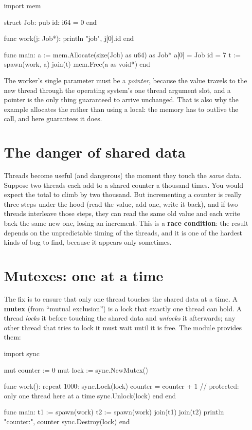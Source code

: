 \begin{salamen}
import mem

struct Job:
    pub id: i64 = 0
end

func work(j: Job*):
    println "job", j[0].id
end

func main:
    a := mem.Allocate(size(Job) as u64) as Job*
    a[0] = Job { id = 7 }
    t := spawn(work, a)
    join(t)
    mem.Free(a as void*)
end
\end{salamen}

The worker's single parameter must be a \emph{pointer}, because the value travels
to the new thread through the operating system's one thread argument slot, and a
pointer is the only thing guaranteed to arrive unchanged. That is also why the
example allocates the  rather than using a local: the memory has to
outlive the  call, and here  guarantees it does.

\section{The danger of shared data}

Threads become useful (and dangerous) the moment they touch the \emph{same}
data. Suppose two threads each add to a shared counter a thousand times. You would
expect the total to climb by two thousand. But incrementing a counter is really
three steps under the hood (read the value, add one, write it back), and if two
threads interleave those steps, they can read the same old value and each write
back the same new one, losing an increment. This is a \textbf{race condition}: the
result depends on the unpredictable timing of the threads, and it is one of the
hardest kinds of bug to find, because it appears only sometimes.

\section{Mutexes: one at a time}

The fix is to ensure that only one thread touches the shared data at a time. A
\textbf{mutex} (from ``mutual exclusion'') is a lock that exactly one thread can
hold. A thread \emph{locks} it before touching the shared data and \emph{unlocks}
it afterwards; any other thread that tries to lock it must wait until it is free.
The  module provides them:

\begin{salamen}
import sync

mut counter := 0
mut lock := sync.NewMutex()

func work():
    repeat 1000:
        sync.Lock(lock)
        counter = counter + 1     // protected: only one thread here at a time
        sync.Unlock(lock)
    end
end

func main:
    t1 := spawn(work)
    t2 := spawn(work)
    join(t1)
    join(t2)
    println "counter:", counter
    sync.Destroy(lock)
end
\end{salamen}

